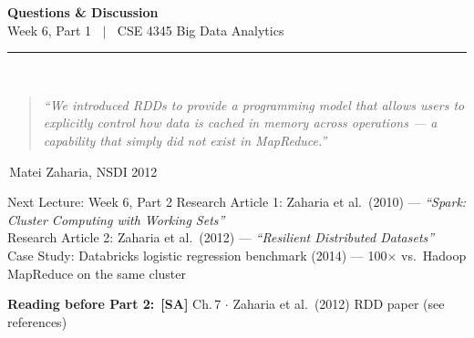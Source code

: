 \documentclass[aspectratio=169,10pt]{beamer}
\begin{document}
\begin{frame}[c]
  \begin{center}
    {\Large\bfseries Questions \& Discussion}\\[10pt]
    {\large Week 6, Part 1 $\;\mid\;$ CSE 4345 Big Data Analytics}\\[8pt]
    \textcolor{PUGray}{\rule{7cm}{0.5pt}}\\[10pt]
    \begin{quote}
      \itshape ``We introduced RDDs to provide a programming model that allows users to explicitly control how data is cached in memory across operations --- a capability that simply did not exist in MapReduce.''
    \end{quote}
    \hfill\textemdash\,Matei Zaharia, NSDI 2012
    \vspace{12pt}
    \begin{block}{\centering Next Lecture: Week 6, Part 2}
      \centering
      Research Article 1: Zaharia et al.\ (2010) --- \textit{``Spark: Cluster Computing with Working Sets''}\\[4pt]
      Research Article 2: Zaharia et al.\ (2012) --- \textit{``Resilient Distributed Datasets''}\\[4pt]
      \small Case Study: Databricks logistic regression benchmark (2014) ---
      100$\times$ vs.\ Hadoop MapReduce on the same cluster
    \end{block}
    \vspace{6pt}
    \textbf{Reading before Part 2:}\ \textbf{[SA]} Ch.\,7 $\cdot$ Zaharia et al.\ (2012) RDD paper (see references)
  \end{center}
\end{frame}

\end{document}
